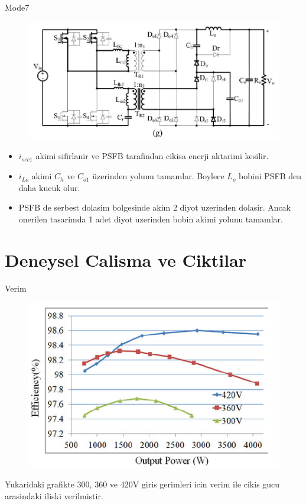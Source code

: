 \documentclass[10pt]{beamer}
\begin{document}
\begin{frame}{Mode7}
	\begin{figure}
		\centering
		\includegraphics[scale=0.30]{mode_g.png}
	\end{figure}
	\begin{itemize}
		\item $i_{sec1}$ akimi sifirlanir ve PSFB tarafindan cikisa enerji aktarimi kesilir.
		\item $i_{Lo}$ akimi $C_h$ ve $C_{o1}$ üzerinden yolunu tamamlar. Boylece $L_o$ bobini PSFB den daha kucuk olur.
 		\item PSFB de serbest dolasim bolgesinde akim 2 diyot uzerinden dolasir. Ancak onerilen tasarimda 1 adet diyot uzerinden bobin akimi yolunu tamamlar.
	\end{itemize}
\end{frame}


\section{Deneysel Calisma ve Ciktilar}
\begin{frame}{Verim}
	\begin{figure}
		\centering
		\includegraphics[scale=0.50]{efficiency.png}
	\end{figure}
	Yukaridaki grafikte 300, 360 ve 420V giris gerimleri icin verim ile cikis gucu arasindaki iliski verilmistir.
\end{frame}
\end{document}
